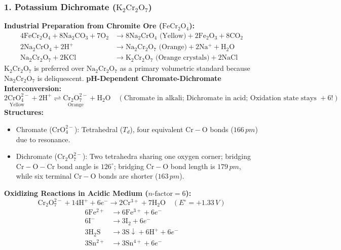 \documentclass[10pt,a4paper]{article}
\begin{document}
\subsubsection{1. Potassium Dichromate ($\mathrm{K_2Cr_2O_7}$)}
\textbf{Industrial Preparation from Chromite Ore ($\mathrm{FeCr_2O_4}$):}
\begin{align}
  4\mathrm{FeCr_2O_4} + 8\mathrm{Na_2CO_3} + 7\mathrm{O_2} &\longrightarrow 8\mathrm{Na_2CrO_4\text{ (Yellow)}} + 2\mathrm{Fe_2O_3} + 8\mathrm{CO_2} \\
  2\mathrm{Na_2CrO_4} + 2\mathrm{H^+} &\longrightarrow \mathrm{Na_2Cr_2O_7\text{ (Orange)}} + 2\mathrm{Na^+} + \mathrm{H_2O} \\
  \mathrm{Na_2Cr_2O_7} + 2\mathrm{KCl} &\longrightarrow \mathbf{\mathrm{K_2Cr_2O_7\text{ (Orange crystals)}}} + 2\mathrm{NaCl}
\end{align}
$\mathrm{K_2Cr_2O_7}$ is preferred over $\mathrm{Na_2Cr_2O_7}$ as a primary volumetric standard because $\mathrm{Na_2Cr_2O_7}$ is deliquescent.
\textbf{pH-Dependent Chromate-Dichromate Interconversion:}
\begin{equation}
  \underset{\text{Yellow}}{\mathrm{2CrO_4^{2-}}} + 2\mathrm{H^+} \rightleftharpoons \underset{\text{Orange}}{\mathrm{Cr_2O_7^{2-}}} + \mathrm{H_2O} \quad (\text{Chromate in alkali; Dichromate in acid; Oxidation state stays }+6!)
\end{equation}
\textbf{Structures:}
\begin{itemize}
  \item Chromate ($\mathrm{CrO_4^{2-}}$): Tetrahedral ($T_d$), four equivalent $\mathrm{Cr-O}$ bonds ($166\,\si{pm}$) due to resonance.
  \item Dichromate ($\mathrm{Cr_2O_7^{2-}}$): Two tetrahedra sharing one oxygen corner; bridging $\mathrm{Cr-O-Cr}$ bond angle is \textbf{$126^\circ$}; bridging $\mathrm{Cr-O}$ bond length is $179\,\si{pm}$, while six terminal $\mathrm{Cr-O}$ bonds are shorter ($163\,\si{pm}$).
\end{itemize}
\textbf{Oxidizing Reactions in Acidic Medium ($n\text{-factor} = 6$):}
\begin{equation}
  \mathrm{Cr_2O_7^{2-}} + 14\mathrm{H^+} + 6e^- \longrightarrow 2\mathrm{Cr^{3+}} + 7\mathrm{H_2O} \quad (E^\circ = +1.33\,\si{V})
\end{equation}
\begin{align}
  6\mathrm{Fe^{2+}} &\longrightarrow 6\mathrm{Fe^{3+}} + 6e^- \\
  6\mathrm{I^-} &\longrightarrow 3\mathrm{I_2} + 6e^- \\
  3\mathrm{H_2S} &\longrightarrow 3\mathrm{S\downarrow} + 6\mathrm{H^+} + 6e^- \\
  3\mathrm{Sn^{2+}} &\longrightarrow 3\mathrm{Sn^{4+}} + 6e^-
\end{align}
\end{document}
